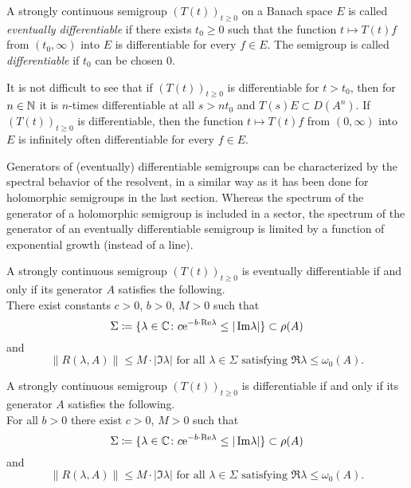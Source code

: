 \begin{definition}\label{def:a2-1.16}
A strongly continuous semigroup $(T(t))_{t \geq 0}$ on a Banach space $E$ is called \emph{eventually differentiable} if there exists $t_0 \geq 0$ such that the function $t \mapsto T(t)f$ from $(t_0,\infty)$ into $E$ is differentiable for every $f \in E$.
The semigroup is called \emph{differentiable} if $t_0$ can be chosen $0$.
\end{definition}

It is not difficult to see that if $(T(t))_{t \geq 0}$ is differentiable for $t > t_{0}$, then for $n \in \mathbb{N}$ it is $n$-times differentiable at all $s > nt_{0}$ and $T(s)E \subset D(A^n)$. 
If $(T(t))_{t\geq 0}$ is differentiable, then the function $t \mapsto T(t)f$ from $(0,\infty)$ into $E$ is infinitely often differentiable for every $f \in E$.

Generators of (eventually) differentiable semigroups 
can be characterized by the spectral behavior of the resolvent,
in a similar way as it has been done for holomorphic semigroups in the last section.
Whereas the spectrum of the generator of a holomorphic semigroup is included in a sector, the spectrum of the generator of an eventually differentiable semigroup is limited by a function of exponential growth (instead of a line).
\begin{theorem}\label{thm:a2-1.17}
A strongly continuous semigroup $(T(t))_{t\geq 0}$ is eventually differentiable if and only if its generator $A$ satisfies the following. \\
There exist constants $c>0$, $b>0$, $M>0$ such that
\[
    \Sigma \coloneqq \{\lambda \in \mathbb{C} \colon c\mathrm{e}^{-b\cdot \mathop{}\!\mathrm{Re}\lambda} \leq |\mathop{}\!\mathrm{Im}\lambda|\} \subset \rho(A)
\]
and
\[
    \|R(\lambda,A)\| \leq M\cdot|\Im\lambda| \text{ for all } \lambda \in \Sigma \text{ satisfying } \Re\lambda \leq \omega_{0}(A).
\]
\end{theorem}

\begin{theorem}\label{thm:a2-1.18}
A strongly continuous semigroup $(T(t))_{t\geq 0}$ is differentiable if and only if its generator $A$ satisfies the following. \\
For all $b>0$ there exist $c>0$, $M>0$ such that
\[
    \Sigma \coloneqq \{\lambda \in \mathbb{C} \colon c\mathrm{e}^{-b\cdot \mathop{}\!\mathrm{Re}\lambda} \leq |\mathop{}\!\mathrm{Im}\lambda|\} \subset \rho(A)
\]
and
\[
    \|R(\lambda,A)\| \leq M\cdot|\Im\lambda| \text{ for all } \lambda \in \Sigma \text{ satisfying } \Re\lambda \leq \omega_{0}(A).
\]
\end{theorem}

